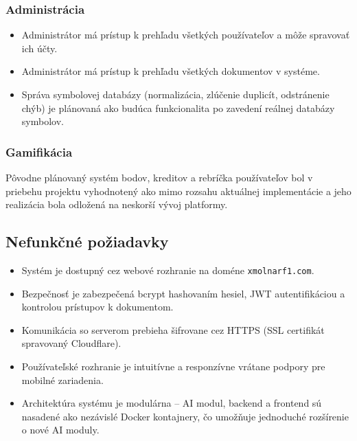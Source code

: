 \subsubsection{Administrácia}

\begin{itemize}
    \item[\checkmark] Administrátor má prístup k prehľadu všetkých používateľov a môže spravovať ich účty.
    \item[\checkmark] Administrátor má prístup k prehľadu všetkých dokumentov v systéme.
    \item[$\circ$] Správa symbolovej databázy (normalizácia, zlúčenie duplicít, odstránenie chýb) je plánovaná ako budúca funkcionalita po zavedení reálnej databázy symbolov.
\end{itemize}

\subsubsection{Gamifikácia}

Pôvodne plánovaný systém bodov, kreditov a rebríčka používateľov bol v priebehu projektu vyhodnotený ako mimo rozsahu aktuálnej implementácie a jeho realizácia bola odložená na neskorší vývoj platformy.

\subsection{Nefunkčné požiadavky}

\begin{itemize}
    \item[\checkmark] Systém je dostupný cez webové rozhranie na doméne \texttt{xmolnarf1.com}.
    \item[\checkmark] Bezpečnosť je zabezpečená bcrypt hashovaním hesiel, JWT autentifikáciou a kontrolou prístupov k dokumentom.
    \item[\checkmark] Komunikácia so serverom prebieha šifrovane cez HTTPS (SSL certifikát spravovaný Cloudflare).
    \item[\checkmark] Používateľské rozhranie je intuitívne a responzívne vrátane podpory pre mobilné zariadenia.
    \item[\checkmark] Architektúra systému je modulárna – AI modul, backend a frontend sú nasadené ako nezávislé Docker kontajnery, čo umožňuje jednoduché rozšírenie o nové AI moduly.
\end{itemize}
